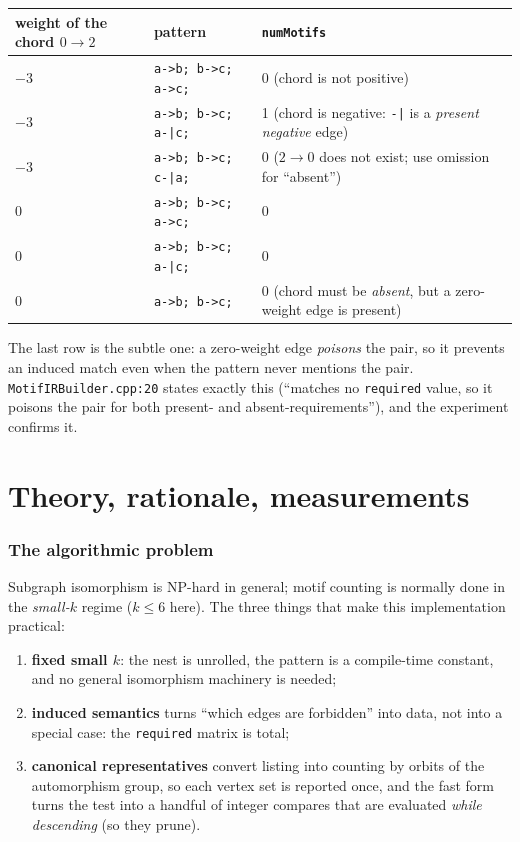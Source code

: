 \documentclass[11pt,a4paper]{article}
\newcommand{\code}[1]{\texttt{#1}}
\begin{document}
\begin{center}
\begin{tabular}{@{}lll@{}}
\toprule
weight of the chord $0{\to}2$ & pattern & \code{numMotifs} \\
\midrule
$-3$ & \code{a->b; b->c; a->c;} & 0 \quad (chord is not positive) \\
$-3$ & \code{a->b; b->c; a-|c;} & 1 \quad (chord is negative: \code{-|} is a \emph{present negative} edge) \\
$-3$ & \code{a->b; b->c; c-|a;} & 0 \quad ($2{\to}0$ does not exist; use omission for ``absent'') \\
$0$  & \code{a->b; b->c; a->c;} & 0 \\
$0$  & \code{a->b; b->c; a-|c;} & 0 \\
$0$  & \code{a->b; b->c;}       & 0 \quad (chord must be \emph{absent}, but a zero-weight edge is present) \\
\bottomrule
\end{tabular}
\end{center}

The last row is the subtle one: a zero-weight edge \emph{poisons} the pair, so it
prevents an induced match even when the pattern never mentions the pair.
\code{MotifIRBuilder.cpp:20} states exactly this (``matches no
\code{required} value, so it poisons the pair for both present- and
absent-requirements''), and the experiment confirms it.

\part{Theory, rationale, measurements}

\section{The algorithmic problem}

Subgraph isomorphism is NP-hard in general; motif counting is normally done in
the \emph{small-$k$} regime ($k\le 6$ here). The three things that make this
implementation practical:

\begin{enumerate}
  \item \textbf{fixed small $k$}: the nest is unrolled, the pattern is a
        compile-time constant, and no general isomorphism machinery is needed;
  \item \textbf{induced semantics} turns ``which edges are forbidden'' into
        data, not into a special case: the \code{required} matrix is total;
  \item \textbf{canonical representatives} convert listing into counting by
        orbits of the automorphism group, so each vertex set is reported once,
        and the fast form turns the test into a handful of integer compares that
        are evaluated \emph{while descending} (so they prune).
\end{enumerate}
\end{document}
